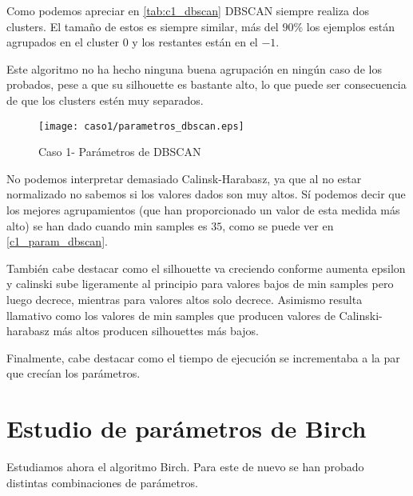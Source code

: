 Como podemos apreciar en \eqref{tab:c1_dbscan} DBSCAN siempre realiza dos clusters. El tamaño de estos es siempre similar, más del $90\%$ los ejemplos están agrupados en el cluster $0$ y los restantes están en el $-1$.

Este algoritmo no ha hecho ninguna buena agrupación en ningún caso de los probados, pese a que su silhouette es bastante alto, lo que puede ser consecuencia de que los clusters estén muy separados.

\begin{figure}[H]
\caption{Caso 1- Parámetros de DBSCAN}
\label{c1_param_dbscan}
\texttt{[image: caso1/parametros\_dbscan.eps]}
\end{figure}

No podemos interpretar demasiado Calinsk-Harabasz, ya que al no estar normalizado no sabemos si los valores dados son muy altos. Sí podemos decir que los mejores agrupamientos (que han proporcionado un valor de esta medida más alto) se han dado cuando min samples es $35$, como se puede ver en \eqref{c1_param_dbscan}.

También cabe destacar como el silhouette va creciendo conforme aumenta epsilon y calinski sube ligeramente al principio para valores bajos de min samples pero luego decrece, mientras para valores altos solo decrece. Asimismo resulta llamativo como los valores de min samples que producen valores de Calinski-harabasz más altos producen silhouettes más bajos.

Finalmente, cabe destacar como el tiempo de ejecución se incrementaba a la par que crecían los parámetros.


\section{Estudio de parámetros de Birch}

Estudiamos ahora el algoritmo Birch. Para este de nuevo se han probado distintas combinaciones de parámetros.

